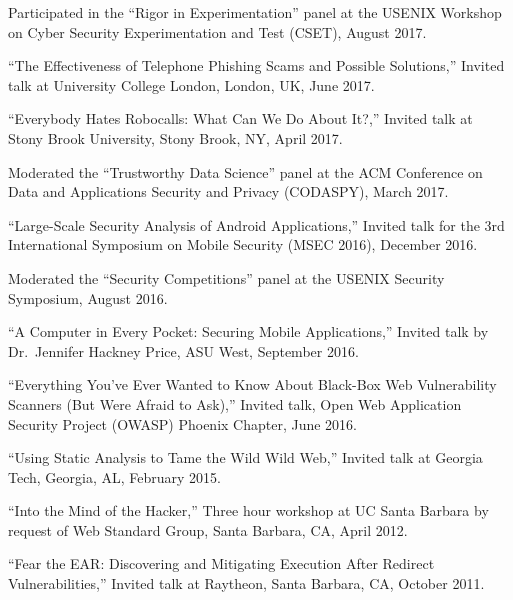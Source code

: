 \documentclass[11pt,letterpaper,sans]{moderncv}
\begin{document}
\begin{etaremune}
  \item Participated in the ``Rigor in Experimentation'' panel at the
    USENIX Workshop on Cyber Security Experimentation and Test (CSET),
    August 2017.

  \item ``The Effectiveness of Telephone Phishing Scams and Possible Solutions,''
    Invited talk at University College London, London, UK, June
    2017.

  \item ``Everybody Hates Robocalls: What Can We Do About It?,''
    Invited talk at Stony Brook University, Stony Brook, NY, April
    2017.

  \item Moderated the ``Trustworthy Data Science'' panel at the ACM
    Conference on Data and Applications Security and Privacy
    (CODASPY), March 2017.

  \item ``Large-Scale Security Analysis of Android Applications,''
    Invited talk for the 3rd International Symposium on Mobile
    Security (MSEC 2016), December 2016.

  \item Moderated the ``Security Competitions'' panel at the USENIX
    Security Symposium, August 2016.

  \item ``A Computer in Every Pocket: Securing Mobile Applications,''
    Invited talk by Dr.\ Jennifer Hackney Price, ASU West, September
    2016.

  \item ``Everything You've Ever Wanted to Know About Black-Box Web
    Vulnerability Scanners (But Were Afraid to Ask),'' Invited talk,
    Open Web Application Security Project (OWASP) Phoenix Chapter,
    June 2016.

  \item ``Using Static Analysis to Tame the Wild Wild Web,'' Invited
    talk at Georgia Tech, Georgia, AL, February 2015.

  \item ``Into the Mind of the Hacker,'' Three hour workshop at UC
    Santa Barbara by request of Web Standard Group, Santa Barbara, CA,
    April 2012.

  \item ``Fear the EAR: Discovering and Mitigating Execution After
    Redirect Vulnerabilities,'' Invited talk at Raytheon, Santa
    Barbara, CA, October 2011.

\end{etaremune}
\end{document}
